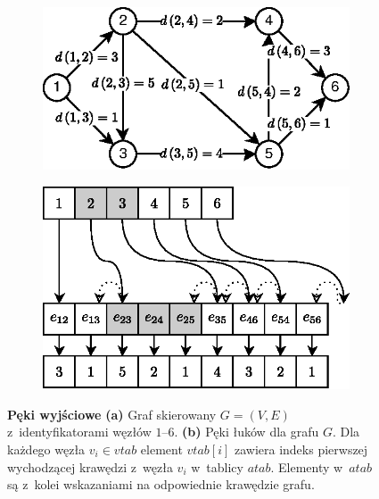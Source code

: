 \begin{figure}[!htbp]
	\centering
	\begin{subfigure}[b]{0.5\textwidth}
		\includegraphics[width=\textwidth]{Chapter_I/4/1_4a.eps}
		\caption{}
	\end{subfigure}%
	\qquad
	\begin{subfigure}[b]{0.4\textwidth}
		\includegraphics[width=\textwidth]{Chapter_I/4/1_4b.eps}
		\caption{}
	\end{subfigure}
	\caption{\textbf{Pęki wyjściowe} \textbf{(a)} Graf skierowany $G = \left( V, E \right)$ z~identyfikatorami węzłów $1$--$6$. \textbf{(b)} Pęki łuków dla grafu $G$. Dla każdego węzła $v_{i} \in vtab$ element $ vtab \left[ i \right] $ zawiera indeks pierwszej wychodzącej krawędzi z~węzła $v_{i}$ w~tablicy $atab$. Elementy w~$atab$ są z~kolei wskazaniami na odpowiednie krawędzie grafu.}\label{fig:forwardStarRepresentation}
\end{figure}

